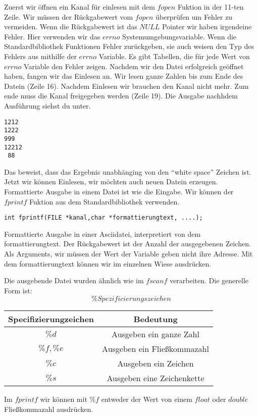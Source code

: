 \documentclass{article}[12pt]
\newenvironment{myexampleblock}[1]{%
    \tcolorbox[beamer,%
    noparskip,breakable,
    colback=White,colframe=ForestGreen,%
    colbacklower=LimeGreen!75!White,%
    title=#1]}%
    {\endtcolorbox}
\begin{document}
Zuerst wir öffnen ein Kanal für einlesen mit dem $fopen$ Fuktion in der 11-ten Zeile. Wir müssen 
der Rückgabewert vom $fopen$ überprüfen um Fehler zu vermeiden. Wenn die Rückgabewert ist das 
$NULL$ Pointer wir haben irgendeine Fehler. Hier verwenden wir das $errno$ Systemumgebungsvariable.
Wenn die Standardbibliothek Funktionen Fehler zurückgeben, sie auch weisen den Typ des Fehlers aus mithilfe
der $errno$ Variable. Es gibt Tabellen, die für jede Wert von $errno$ Variable den Fehler zeigen.
Nachdem wir den Datei erfolgreich geöffnet haben, fangen wir das Einlesen an. Wir lesen 
ganze Zahlen bis zum Ende des Datein (Zeile 16). Nachdem Einlesen wir brauchen den Kanal nicht mehr. 
Zum ende muss die Kanal freigegeben werden (Zeile 19). Die Ausgabe nachhdem Ausführung siehst du unter.
\begin{lstlisting}
1212
1222
999
12212
 88
\end{lstlisting}
Das beweist, dass das Ergebnis unabhänging von den ``white space'' Zeichen ist. Jetzt wir können Einlesen, 
wir möchten auch neuen Datein erzeugen. Formattierte Ausgabe in einem Datei ist wie die Eingabe. Wir können 
der $fprintf$ Fuktion aus dem Standardbibliothek verwenden.
\begin{myexampleblock}{Funktion: \texttt{fprintf}}
\begin{lstlisting}
int fprintf(FILE *kanal,char *formattierungtext, ....);
\end{lstlisting}
Formattierte Ausgabe in einer Asciidatei, interpretiert von dem formattierungtext. Der Rückgabewert ist der
Anzahl der ausgegebenen Zeichen. Als Arguments, wir müssen der Wert der Variable geben
nicht ihre Adresse. Mit dem formattierungtext können wir im einzelnen Wiese ausdrücken.

Die ausgebende Datei wurden ähnlich wie im $fscanf$ verarbeiten. Die generelle Form ist:
$$\%Spezificierungszeichen$$
{
\begin{center}
\begin{tabular}{|cc|}
\hline
Specifizierungzeichen & Bedeutung \\\hline
$\%d$   &  Ausgeben ein ganze Zahl \\
$\%f,\%e$   & Ausgeben ein Fließkommazahl  \\
$\%c$  & Ausgeben ein Zeichen  \\
$\%s$  & Ausgeben eine Zeichenkette\\
\hline
\end{tabular}
\end{center}
}
Im $fprintf$ wir können mit $\%f$ entweder der Wert von einem $float$ oder $double$ Fließkommazahl
ausdrücken.
\end{myexampleblock}
\end{document}
